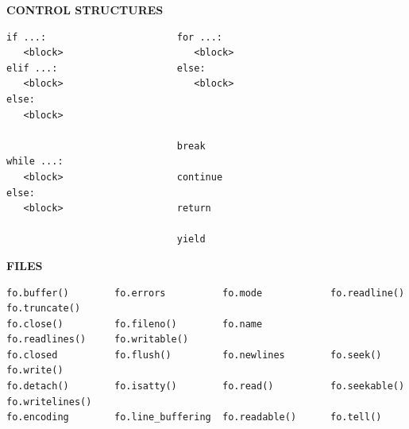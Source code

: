 \documentclass[9pt,a4wide]{extarticle}
\begin{document}
\bigskip
{\LARGE\bf CONTROL STRUCTURES}


\begin{verbatim}
if ...:                       for ...:      
   <block>                       <block>
elif ...:                     else:
   <block>                       <block>  
else:
   <block>

                              break
while ...:                              
   <block>                    continue
else:                                
   <block>                    return   

                              yield
\end{verbatim}



\bigskip
{\LARGE\bf FILES}

\begin{verbatim}
fo.buffer()        fo.errors          fo.mode            fo.readline()      fo.truncate()
fo.close()         fo.fileno()        fo.name            fo.readlines()     fo.writable()
fo.closed          fo.flush()         fo.newlines        fo.seek()          fo.write()
fo.detach()        fo.isatty()        fo.read()          fo.seekable()      fo.writelines()
fo.encoding        fo.line_buffering  fo.readable()      fo.tell()            
\end{verbatim}

\medskip
\end{document}
